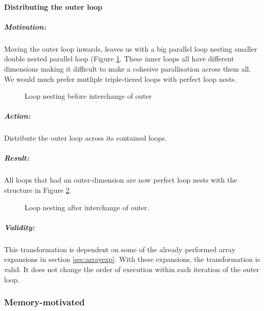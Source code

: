 \paragraph{Distributing the outer loop}
\subparagraph{Motivation:} Moving the outer loop inwards, leaves us with a big parallel loop nesting smaller double nested parallel loop
 (Figure \ref{fig:bintouter}.
 These inner loops all have different dimensions making it difficult to make a cohesive parallisation across them all. We would much
 prefer mutliple triple-tiered loops with perfect loop nests.\\
 \begin{figure}[h!]
   \centering
{}
   \caption{Loop nesting before interchange of outer}
   \label{fig:bintouter}
 \end{figure}
\subparagraph{Action:} Distribute the outer loop across its contained loops.
\subparagraph{Result:} All loops that had an outer-dimension are now perfect loop nests with the structure in Figure \ref{fig:aintouter}.
\begin{figure}[h!]
  \centering
{}
  \caption{Loop nesting after interchange of outer.}
  \label{fig:aintouter}
\end{figure}
\subparagraph{Validity:} This transformation is dependent on some of the already performed array expansions in section \ref{sec:arrayexp}.
 With these expansions, the transformation is valid. It does not change the order of execution within each iteration of the outer loop.
\subsubsection{Memory-motivated}
\label{memory}
